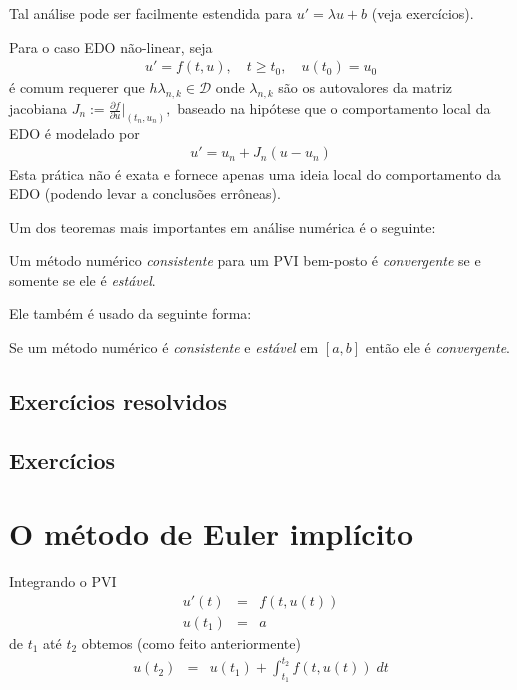 Tal análise pode ser facilmente estendida para $u'=\lambda u+b$ (veja exercícios).

Para o caso EDO não-linear, seja
\begin{eqnarray}
u'= f(t,u), \quad  t\geq t_0, \quad  u(t_0)=u_0
\end{eqnarray}
é comum requerer que $h\lambda _{n,k} \in \mathcal D$ onde $\lambda _{n,k}$ são os autovalores da matriz jacobiana $J_n := \frac{\partial f}{\partial u}|_{(t_n,u_n)},$ baseado na hipótese que o comportamento local da EDO é modelado por
\begin{eqnarray}
  u'= u_n + J_n(u-u_n)
\end{eqnarray}
Esta prática não é exata e fornece apenas uma ideia local do comportamento da EDO (podendo levar a conclusões errôneas).


Um dos teoremas mais importantes em análise numérica é o seguinte:

\begin{teo}
Um método numérico \emph{consistente} para um PVI bem-posto é \emph{convergente} se e somente se ele é \emph{estável}.
\end{teo}


Ele também é usado da seguinte forma:

\begin{teo}
Se um método numérico é \emph{consistente} e \emph{estável} em $[a,b]$ então ele é \emph{convergente}.
\end{teo}



\subsection*{Exercícios resolvidos}

\emconstrucao

\subsection*{Exercícios}

\emconstrucao


\section{O método de Euler implícito}
Integrando o PVI
\begin{eqnarray}
  u'(t)  &=& f(t,u(t)) \\
  u(t_1) &=& a
\end{eqnarray}
de $t_1$ até $t_2$ obtemos (como feito anteriormente)
\begin{eqnarray}
  u(t_2)      &=& u(t_1) +  \int_{t_1}^{t_2} f(t,u(t)) \; dt
\end{eqnarray}

